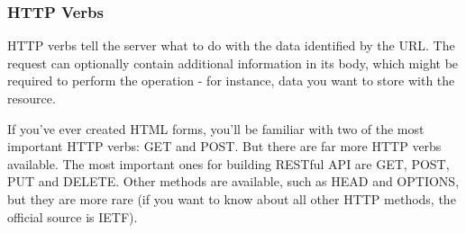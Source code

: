\subsubsection{HTTP Verbs}

HTTP verbs tell the server what to do with the data identified by the URL. The request can optionally contain additional information in its body, which might be required to perform the operation - for instance, data you want to store with the resource.

If you've ever created HTML forms, you'll be familiar with two of the most important HTTP verbs: GET and POST. But there are far more HTTP verbs available. The most important ones for building RESTful API are GET, POST, PUT and DELETE. Other methods are available, such as HEAD and OPTIONS, but they are more rare (if you want to know about all other HTTP methods, the official source is IETF).






